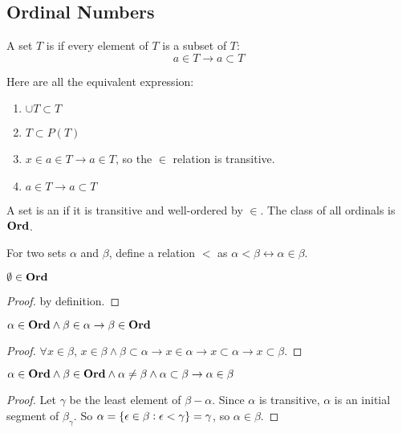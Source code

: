 \subsection{Ordinal Numbers}

\begin{definition}
    A set $T$ is  if every element of $T$ is a subset of $T$:
    \begin{equation}
        a \in T \rightarrow a \subset T
    \end{equation}
    
    Here are all the equivalent expression:
    \begin{enumerate}
        \item $\cup T \subset T$ 
        \item $T \subset P(T)$
        \item $x \in a \in T \rightarrow a \in T$, so the $\in$ relation is transitive.
        \item $a \in T \rightarrow a \subset T$
    \end{enumerate}
\end{definition}

\begin{definition}
    A set is an  if it is transitive and well-ordered by $\in$. The class of all ordinals is $\mathbf{Ord}$.
\end{definition}

\begin{definition}
    For two sets $\alpha$ and $\beta$, define a relation $<$ as $\alpha < \beta \leftrightarrow \alpha \in \beta$.
\end{definition}

\begin{theorem}
    $\emptyset \in \mathbf{Ord}$
\end{theorem}
\begin{proof}
    by definition.
\end{proof}

\begin{theorem}
    $\alpha \in \mathbf{Ord} \wedge \beta \in \alpha \rightarrow \beta \in \mathbf{Ord}$
\end{theorem}
\begin{proof}
    $\forall x \in \beta$, $x \in \beta \wedge \beta \subset \alpha \rightarrow x \in \alpha \rightarrow x \subset \alpha \rightarrow x \subset \beta $.
\end{proof}

\begin{theorem}
    $\alpha \in \mathbf{Ord} \wedge \beta \in \mathbf{Ord} \wedge \alpha \neq \beta \wedge \alpha \subset \beta  \rightarrow \alpha \in \beta$    
\end{theorem}
\begin{proof}
    Let $\gamma$ be the least element of $\beta - \alpha$. Since $\alpha$ is transitive, $\alpha$ is an initial segment of $\beta_\gamma$. So $\alpha = \set{\epsilon \in \beta: \epsilon < \gamma} = \gamma$, so $\alpha \in \beta$.
\end{proof}

